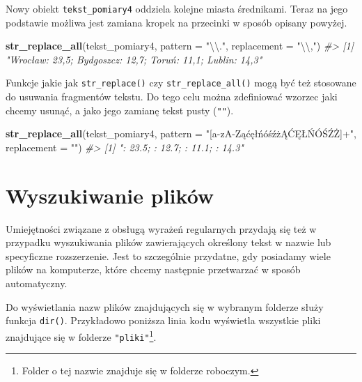 \documentclass[paper=6in:9in,pagesize=pdftex,headinclude=on,footinclude=on,10pt]{scrbook}
\newenvironment{Shaded}{\begin{snugshade}}{\end{snugshade}}
\newcommand{\CharTok}[1]{\textcolor[rgb]{0.31,0.60,0.02}{#1}}
\newcommand{\CommentTok}[1]{\textcolor[rgb]{0.56,0.35,0.01}{\textit{#1}}}
\newcommand{\DataTypeTok}[1]{\textcolor[rgb]{0.13,0.29,0.53}{#1}}
\newcommand{\KeywordTok}[1]{\textcolor[rgb]{0.13,0.29,0.53}{\textbf{#1}}}
\newcommand{\NormalTok}[1]{#1}
\newcommand{\StringTok}[1]{\textcolor[rgb]{0.31,0.60,0.02}{#1}}
\begin{document}
Nowy obiekt \texttt{tekst\_pomiary4} oddziela kolejne miasta średnikami.
Teraz na jego podstawie możliwa jest zamiana kropek na przecinki w sposób opisany powyżej.

\begin{Shaded}
\begin{Highlighting}[]
\KeywordTok{str_replace_all}\NormalTok{(tekst_pomiary4, }
                \DataTypeTok{pattern =} \StringTok{"}\CharTok{\textbackslash{}\textbackslash{}}\StringTok{."}\NormalTok{, }
                \DataTypeTok{replacement =} \StringTok{"}\CharTok{\textbackslash{}\textbackslash{}}\StringTok{,"}\NormalTok{)}
\CommentTok{#> [1] "Wrocław: 23,5; Bydgoszcz: 12,7; Toruń: 11,1; Lublin: 14,3"}
\end{Highlighting}
\end{Shaded}

Funkcje jakie jak \texttt{str\_replace()} czy \texttt{str\_replace\_all()} mogą być też stosowane do usuwania fragmentów tekstu.
Do tego celu można zdefiniować wzorzec jaki chcemy usunąć, a jako jego zamianę tekst pusty (\texttt{""}).

\begin{Shaded}
\begin{Highlighting}[]
\KeywordTok{str_replace_all}\NormalTok{(tekst_pomiary4, }
                \DataTypeTok{pattern =} \StringTok{"[a-zA-ZąćęłńóśźżĄĆĘŁŃÓŚŹŻ]+"}\NormalTok{,}
                \DataTypeTok{replacement =} \StringTok{""}\NormalTok{)}
\CommentTok{#> [1] ": 23.5; : 12.7; : 11.1; : 14.3"}
\end{Highlighting}
\end{Shaded}

\hypertarget{wyszukiwanie-plikuxf3w}{%
\section{Wyszukiwanie plików}\label{wyszukiwanie-plikuxf3w}}

Umiejętności związane z obsługą wyrażeń regularnych przydają się też w przypadku wyszukiwania plików zawierających określony tekst w nazwie lub specyficzne rozszerzenie.
Jest to szczególnie przydatne, gdy posiadamy wiele plików na komputerze, które chcemy następnie przetwarzać w sposób automatyczny.

Do wyświetlania nazw plików znajdujących się w wybranym folderze służy funkcja \texttt{dir()}.
Przykładowo poniższa linia kodu wyświetla wszystkie pliki znajdujące się w folderze \texttt{"pliki"}\footnote{Folder o tej nazwie znajduje się w folderze roboczym.}.
\end{document}
